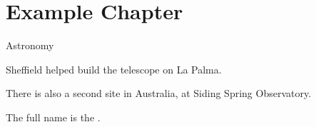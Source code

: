 \chapter{Example Chapter}
\label{chap:chapter1}

Astronomy

Sheffield helped build the  telescope on La Palma.

There is also a second  site in Australia, at Siding Spring Observatory.

The full name is the .